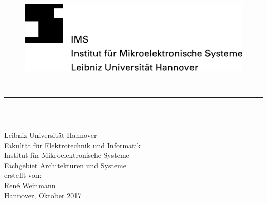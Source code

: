 \begin{titlepage}
	\begin{figure}[ht]
			\includegraphics{pics/IMS_LUH.pdf}
	\end{figure}
	
\vspace{2.5cm}

\begin{center}
	\Huge\normalfont{}\\
	\vspace{40pt}
	\par\noindent\rule{\textwidth}{0.4pt}
  \LARGE\normalfont{}\\
  \par\noindent\rule{\textwidth}{0.4pt}
	\vspace{60pt}
  \Large{	Leibniz Universität Hannover\\
					Fakultät für Elektrotechnik und Informatik\\
					Institut für Mikroelektronische Systeme\\
					Fachgebiet Architekturen und Systeme}\\
	\vspace{70pt}
  \large{erstellt von:}\\
  \vspace{10pt}
	\Large{Ren\'{e} Weinmann}\\
	\vspace{40pt}
	\Large{Hannover, Oktober 2017}
	  
  \end{center}

\end{titlepage}

